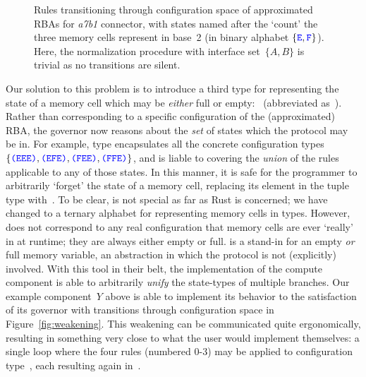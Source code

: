 \begin{figure}[ht]
	\centering
	\footnotesize
	\caption{Rules transitioning through configuration space of approximated RBAs for \textit{a7b1} connector, with states named after the `count' the three memory cells represent in base~2 (in binary alphabet $\{\text{\textcolor{blue}{\texttt{E}}}, \text{\textcolor{blue}{\texttt{F}}}\}$). Here, the normalization procedure with interface set~$\{A,B\}$ is trivial as no transitions are silent.}
	\label{fig:counter_RBAs}
\end{figure}

Our solution to this problem is to introduce a third type for representing the state of a memory cell which may be \textit{either} full or empty:~ (abbreviated as~). Rather than corresponding to a specific configuration of the (approximated) RBA, the governor now reasons about the \textit{set} of states which the protocol may be in. For example, type  encapsulates all the concrete configuration types $\{\text{\textcolor{blue}{\texttt{(EEE)}}}, \text{\textcolor{blue}{\texttt{(EFE)}}}, \text{\textcolor{blue}{\texttt{(FEE)}}}, \text{\textcolor{blue}{\texttt{(FFE)}}}\}$, and is liable to covering the \textit{union} of the rules applicable to any of those states. In this manner, it is safe for the programmer to arbitrarily `forget' the state of a memory cell, replacing its element in the tuple type with~. To be clear,  is not special as far as Rust is concerned; we have changed to a ternary alphabet for representing memory cells in types. However,  does not correspond to any real configuration that memory cells are ever `really' in at runtime; they are always either empty or full.  is a stand-in for an empty \textit{or} full memory variable, an abstraction in which the protocol is not (explicitly) involved.
With this tool in their belt, the implementation of the compute component is able to arbitrarily \textit{unify} the state-types of multiple branches. Our example component~$Y$ above is able to implement its behavior to the satisfaction of its governor with transitions through configuration space in Figure~\ref{fig:weakening}. This weakening can be communicated quite ergonomically, resulting in something very close to what the user would implement themselves: a single loop where the four rules (numbered 0-3) may be applied to configuration type~, each resulting again in~.


